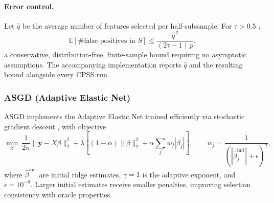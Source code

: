 \documentclass[11pt]{article}
\begin{document}
\paragraph{Error control.} Let $\hat{q}$ be the average number of features selected per
half-subsample. For $\tau > 0.5$ \citep{shah2013},
\begin{equation}
\mathbb{E}[\#\text{false positives in } S] \le \frac{\hat{q}^{\,2}}{(2\tau - 1)\,p},
\end{equation}
a conservative, distribution-free, finite-sample bound requiring no asymptotic assumptions. The
accompanying implementation reports $\hat{q}$ and the resulting bound alongside every CPSS run.

\subsubsection{ASGD (Adaptive Elastic Net)}
\label{sec:asgd}

ASGD implements the Adaptive Elastic Net trained efficiently via stochastic gradient descent
\citep{tibshirani1996,zou2005,zou2006}, with objective
\begin{equation}
\min_{\beta} \ \frac{1}{2n}\|\mathbf{y} - X\beta\|_2^2
+ \lambda\!\left[(1-\alpha)\|\beta\|_2^2 + \alpha \sum_j w_j |\beta_j|\right],
\qquad
w_j = \frac{1}{\left(\left|\hat{\beta}_j^{\mathrm{init}}\right| + \epsilon\right)^{\gamma}},
\end{equation}
where $\hat{\beta}^{\mathrm{init}}$ are initial ridge estimates, $\gamma = 1$ is the adaptive
exponent, and $\epsilon = 10^{-8}$. Larger initial estimates receive smaller penalties, improving
selection consistency with oracle properties.
\end{document}
